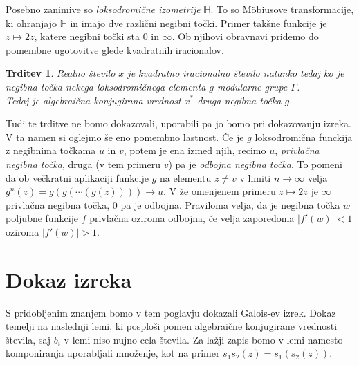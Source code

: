 \documentclass[a4paper,12pt]{article}
\def\H{\mathbb{H}} %
\newtheorem{trditev}{Trditev}
\begin{document}
Posebno zanimive so \emph{loksodromične izometrije} $\H$. To so M\"obiusove transformacije, ki ohranjajo $\H$ in imajo dve različni negibni točki. Primer takšne funkcije je $z \mapsto 2z$, katere negibni točki sta $0$ in $\infty$. Ob njihovi obravnavi pridemo do pomembne ugotovitve glede kvadratnih iracionalov.
\begin{trditev}
    \label{Lokso}
    Realno število $x$ je kvadratno iracionalno število natanko tedaj ko je negibna točka nekega loksodromičnega elementa $g$ modularne grupe $\Gamma$.\\
    Tedaj je algebraična konjugirana vrednost $x^*$ druga negibna točka $g$.
\end{trditev}

Tudi te trditve ne bomo dokazovali,  uporabili pa jo bomo pri dokazovanju izreka. V ta namen si oglejmo še eno pomembno lastnost. Če je $g$ loksodromična funckija z negibnima točkama $u$ in $v$, potem je ena izmed njih, recimo $u$, \emph{privlačna negibna točka}, druga (v tem primeru $v$) pa je \emph{odbojna negibna točka}. To pomeni da ob večkratni aplikaciji funkcije $g$ na elementu $z \neq v$ v limiti $n \to \infty$ velja $g^n(z) = g(g(\cdots(g(z)))) \to u$. V že omenjenem primeru $z \mapsto 2z$ je $\infty$ privlačna negibna točka, $0$ pa je odbojna. Praviloma velja, da je negibna točka $w$ poljubne funkcije $f$ privlačna oziroma odbojna, če velja zaporedoma $|f'(w)| < 1$ oziroma $|f'(w)| > 1$.
\newpage


\section{Dokaz izreka}

S pridobljenim znanjem bomo v tem poglavju dokazali Galois-ev izrek. Dokaz temelji na naslednji lemi, ki posploši pomen algebraične konjugirane vrednosti števila, saj $b_i$ v lemi niso nujno cela števila. Za lažji zapis bomo v lemi namesto komponiranja uporabljali množenje, kot na primer $s_1s_2(z) = s_1(s_2(z))$.
\end{document}
